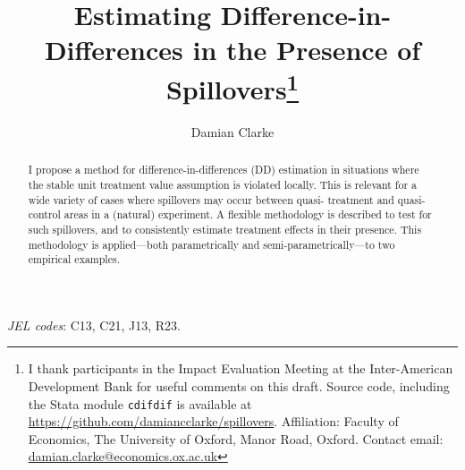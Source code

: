 \documentclass{article}
\title{Estimating Difference-in-Differences in the Presence of Spillovers\footnote{
I thank participants in the Impact Evaluation Meeting at the Inter-American 
Development Bank for useful comments on this draft. Source code, including the
Stata module \texttt{cdifdif} is available at 
\href{https://github.com/damiancclarke/spillovers}{https://github.com/damiancclarke/spillovers}.  
Affiliation: Faculty of Economics, The University of Oxford, Manor Road, 
Oxford. Contact email: \href{mailto:damian.clarke@economics.ox.ac.uk}{damian.clarke@economics.ox.ac.uk}}}
\author{Damian Clarke}
\begin{document}
\maketitle


\begin{abstract}
I propose a method for difference-in-differences (DD) estimation in situations 
where the stable unit treatment value assumption is violated locally. This is
relevant for a wide variety of cases where spillovers may occur between quasi-%
treatment and quasi-control areas in a (natural) experiment. A flexible 
methodology is described to test for such spillovers, and to consistently 
estimate treatment effects in their presence. This methodology is applied---both 
parametrically and semi-parametrically---to two empirical examples.
\end{abstract}
\hspace{8mm} \emph{JEL codes}: C13, C21, J13, R23. \\
\end{document}
